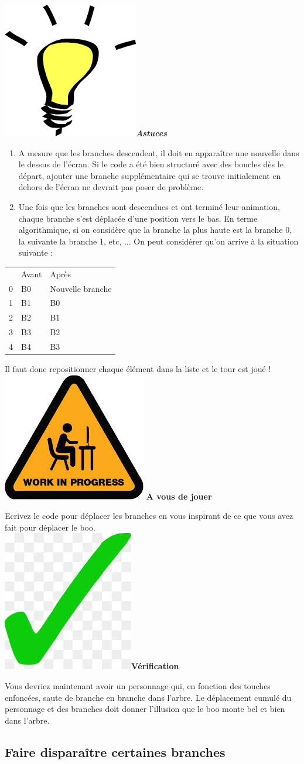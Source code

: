 \documentclass[french]{article}
\newcommand{\tips}{\includegraphics[scale=0.08]{tips}\textbf{\textit{Astuces\\}}}
\newcommand{\todo}{\includegraphics[scale=0.1]{work_in_progress}\textbf{ A vous de jouer\\} }
\newcommand{\result}{\includegraphics[scale=0.1]{green_tick}\textbf{Vérification\\}}
\begin{document}
\tips

\begin{enumerate}

\item A mesure que les branches descendent, il doit en apparaître une nouvelle dans le dessus de l'écran. Si le code a été bien structuré avec des boucles dès le départ, ajouter une branche supplémentaire qui se trouve initialement en dehors de l'écran ne devrait pas poser de problème.\\

\item Une fois que les branches sont descendues et ont terminé leur animation, chaque branche s'est déplacée d'une position vers le bas. En terme algorithmique, si on considère que la branche la plus haute est la branche 0, la suivante la branche 1, etc, ... On peut considérer qu'on arrive à la situation suivante :

\end{enumerate}

\begin{center}
	\begin{tabular}{lll}
	  & Avant & Après\\	
	0 & B0 & Nouvelle branche\\
	1 & B1 & B0\\
	2 & B2 & B1\\
	3 & B3 & B2\\
	4 & B4 & B3\\
	\end{tabular}
\end{center}

Il faut donc repositionner chaque élément dans la liste et le tour est joué !\\

\todo

Ecrivez le code pour déplacer les branches en vous inspirant de ce que vous avez fait pour déplacer le boo.\\

\result

 Vous devriez maintenant avoir un personnage qui, en fonction des touches enfoncées, saute de branche en branche dans l'arbre. Le déplacement cumulé du personnage et des branches doit donner l'illusion que le boo monte bel et bien dans l'arbre.

\subsection{Faire disparaître certaines branches}
\end{document}

